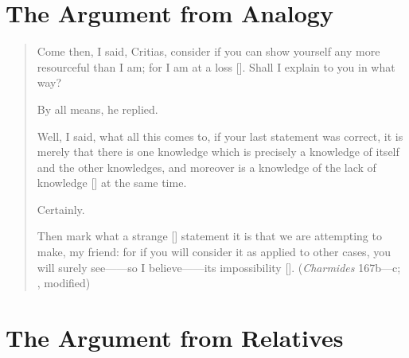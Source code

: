 
\section{The Argument from Analogy} %
\label{sec:the_argument_from_analogy}

\begin{quotation}
	Come then, I said, Critias, consider if you can show yourself any more resourceful than I am; for I am at a loss []. Shall I explain to you in what way?
	
	By all means, he replied.
	
	Well, I said, what all this comes to, if your last statement was correct, it is merely that there is one knowledge which is precisely a knowledge of itself and the other knowledges, and moreover is a knowledge of the lack of knowledge [] at the same time.
	
	Certainly.
	
	Then mark what a strange [] statement it is that we are attempting to make, my friend: for if you will consider it as applied to other cases, you will surely see——so I believe——its impossibility []. (\emph{Charmides} 167b—c; \citealt[57]{Lamb:1927qw}, modified)
\end{quotation}


\section{The Argument from Relatives} %
\label{sec:the_argument_from_relatives}





